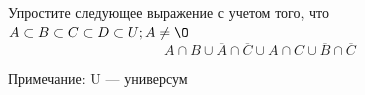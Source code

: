 \question
Упростите следующее выражение с учетом того, что $A\subset B \subset C \subset D \subset U; A \neq \O$
\begin{equation*}
A \cap B \cup \overline{A} \cap \overline{C} \cup A \cap C \cup \overline{B} \cap \overline{C}
\end{equation*}

Примечание: U — универсум